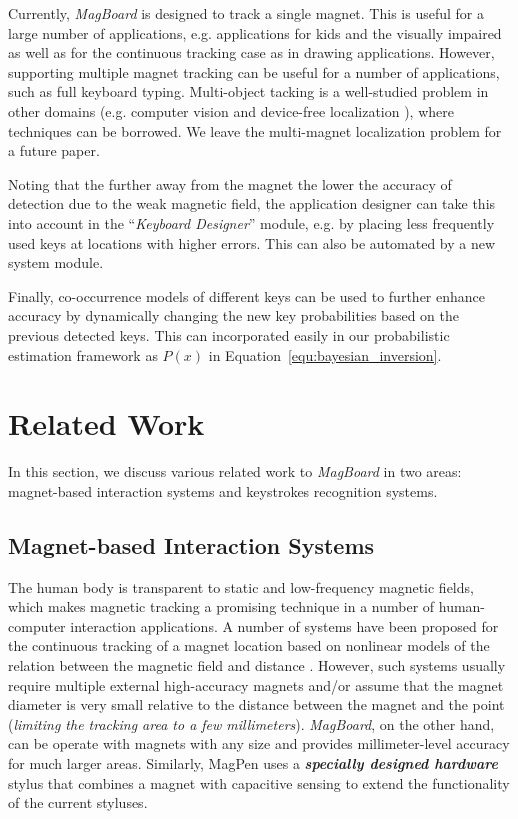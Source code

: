 \documentclass[conference]{IEEEtran}
\def \sys {\textit{MagBoard}}
\begin{document}
Currently, \sys{} is designed to track a single magnet. This is useful for a large number of applications, e.g. applications for kids and the visually impaired as well as for the continuous tracking case as in drawing applications. However, supporting multiple magnet tracking can be useful for a number of applications, such as full keyboard typing. Multi-object tacking is a well-studied problem in other domains (e.g. computer vision \cite{krumm2000multi} and device-free localization \cite{sabek2012multi}), where techniques can be borrowed. We leave the multi-magnet localization problem for a future paper.  

Noting that the further away from the magnet the lower the accuracy of detection due to the weak magnetic field, the application designer can take this into account in the ``\emph{Keyboard Designer}'' module, e.g. by placing less frequently used keys at locations with higher errors. This can also be automated by a new system module.

Finally, co-occurrence models of different keys can be used to further enhance accuracy by dynamically changing the new key probabilities based on the previous detected keys. This can incorporated easily in our probabilistic estimation framework as $P(x)$ in Equation~\ref{equ:bayesian_inversion}.

\section{Related Work}
\label{related_work}
In this section, we discuss various related work to \sys{} in two areas: magnet-based interaction systems and keystrokes recognition systems.

\subsection{Magnet-based Interaction Systems}
The human body is transparent to static and low-frequency magnetic fields, which makes magnetic tracking a promising technique in a number of human-computer interaction applications. A number of systems have been proposed for the continuous tracking of a magnet location based on nonlinear models of the relation between the magnetic field and distance \cite{hu2005efficient,han2007wearable}. 
However, such systems usually require multiple external high-accuracy magnets and/or assume that the magnet diameter is very small relative to the distance between the magnet and the point (\emph{limiting the tracking area to a few millimeters}). \sys{}, on the other hand, can be operate with magnets with any size and provides millimeter-level accuracy for much larger areas. Similarly, MagPen \cite{hwang2013magpen} uses a \textbf{\emph{specially designed hardware}} stylus that combines a magnet with capacitive sensing to extend the functionality of the current styluses.
\end{document}
